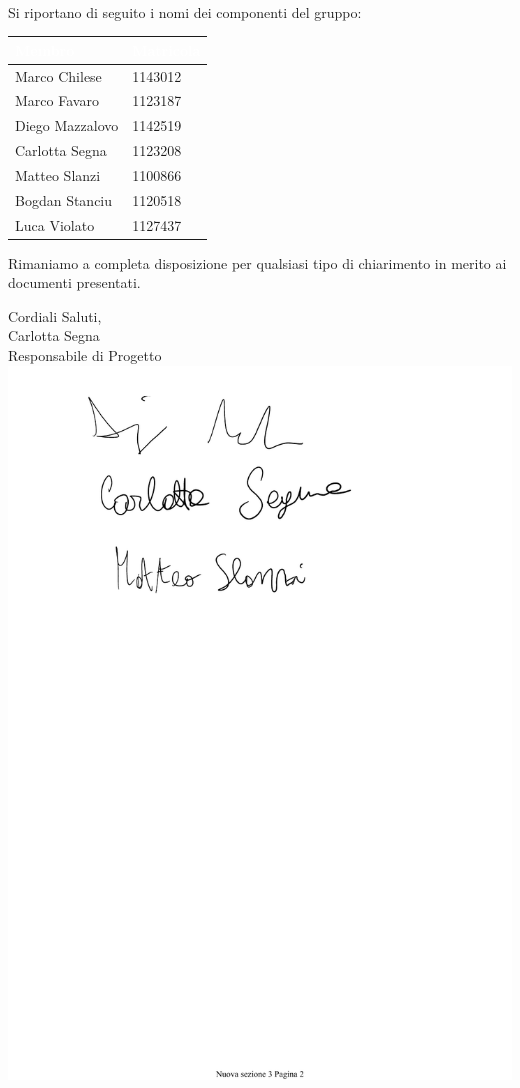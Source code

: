 \documentclass[11pt, a4paper]{letter} %
\begin{document}
\begin{letter}
\-\\
Si riportano di seguito i nomi dei componenti del gruppo:
\begin{center}
\begin{longtable}[c]{|m{}m{}|} 
\hline
\rowcolor{bluelogo}\textbf{\textcolor{white}{Membro}}  & \textbf{\textcolor{white}{Matricola}}\\
\hline
Marco Chilese & 1143012\\
\hline
\rowcolor{grigio}Marco Favaro & 1123187\\ 
\hline
Diego Mazzalovo & 1142519\\
\hline
\rowcolor{grigio}Carlotta Segna & 1123208\\
\hline
Matteo Slanzi & 1100866\\
\hline
\rowcolor{grigio}Bogdan Stanciu  & 1120518\\
\hline
Luca Violato & 1127437\\
\hline
\end{longtable}
\end{center}

Rimaniamo a completa disposizione per qualsiasi tipo di chiarimento in merito ai documenti presentati.

\closing{Cordiali Saluti,\\
Carlotta Segna\\
Responsabile di Progetto
\includegraphics[scale=0.5]{images/CarlottaSegna.pdf}}


\end{letter}
\end{document}
